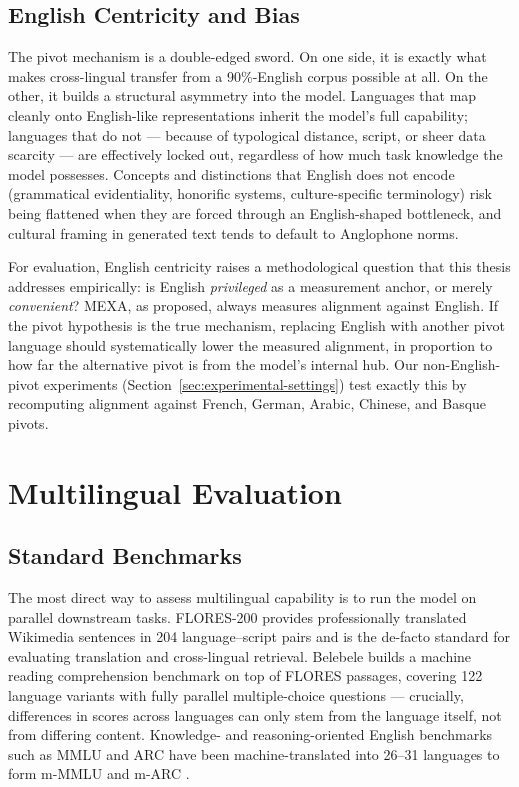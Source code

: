 \subsection{English Centricity and Bias}
\label{subsec:english-bias}

The pivot mechanism is a double-edged sword. On one side, it is exactly
what makes cross-lingual transfer from a 90\%-English corpus possible at
all. On the other, it builds a structural asymmetry into the model.
Languages that map cleanly onto English-like representations inherit the
model's full capability; languages that do not --- because of typological
distance, script, or sheer data scarcity --- are effectively locked out,
regardless of how much task knowledge the model possesses. Concepts and
distinctions that English does not encode (grammatical evidentiality,
honorific systems, culture-specific terminology) risk being flattened when
they are forced through an English-shaped bottleneck, and cultural framing
in generated text tends to default to Anglophone norms.

For evaluation, English centricity raises a methodological question that
this thesis addresses empirically: is English \emph{privileged} as a
measurement anchor, or merely \emph{convenient}? MEXA, as proposed, always
measures alignment against English. If the pivot hypothesis is the true
mechanism, replacing English with another pivot language should
systematically lower the measured alignment, in proportion to how far the
alternative pivot is from the model's internal hub. Our non-English-pivot
experiments (Section~\ref{sec:experimental-settings}) test exactly this by
recomputing alignment against French, German, Arabic, Chinese, and Basque
pivots.

\section{Multilingual Evaluation}
\label{sec:multilingual-eval}

\subsection{Standard Benchmarks}
\label{subsec:benchmarks}

The most direct way to assess multilingual capability is to run the model
on parallel downstream tasks. FLORES-200 \citep{nllbteam2022} provides
professionally translated Wikimedia sentences in 204 language--script
pairs and is the de-facto standard for evaluating translation and
cross-lingual retrieval. Belebele \citep{bandarkar2024belebele} builds a
machine reading comprehension benchmark on top of FLORES passages,
covering 122 language variants with fully parallel multiple-choice
questions --- crucially, differences in scores across languages can only
stem from the language itself, not from differing content. Knowledge- and
reasoning-oriented English benchmarks such as MMLU
\citep{hendrycks2021mmlu} and ARC have been machine-translated into
26--31 languages to form m-MMLU and m-ARC \citep{lai2023okapi}.

